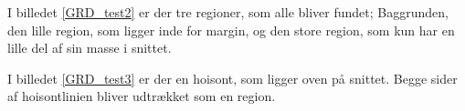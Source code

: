 I billedet \ref{GRD_test2} er der tre regioner, som
alle bliver fundet; Baggrunden, den lille region, som ligger inde for
margin, og den store region, som kun har en lille del af sin masse
i snittet. 

\begin{figure}[!h]
    \centering
    	\hspace{1em}
		\hspace{1em}
        \caption[]{}
     \label{GRD_test2_sammen}
\end{figure}

I billedet \ref{GRD_test3} er der en hoisont, som ligger oven på
snittet. Begge sider af hoisontlinien bliver udtrækket som en region.

